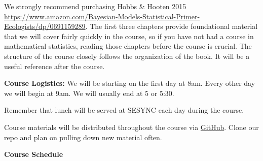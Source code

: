 \documentclass[11pt]{article}
\begin{document}
We strongly recommend purchasing Hobbs \& Hooten 2015 \href{https://www.amazon.com/Bayesian-Models-Statistical-Primer-Ecologists/dp/0691159289}{https://www.amazon.com/Bayesian-Models-Statistical-Primer-Ecologists/dp/0691159289}. The first three chapters provide foundational material that we will cover fairly quickly in the course, so if you have not had a course in mathematical statistics, reading those chapters before the course is crucial. The structure of the course closely follows the organization of the book.  It will be a useful reference after the course.

\textbf{\large Course Logistics:} 
We will be starting on the first day at 8am.  Every other day we will begin at 9am. We will usually end at 5 or 5:30.  

Remember that lunch will be served at SESYNC each day during the course.

Course materials will be distributed throughout the course via \href{https://github.com/CCheCastaldo/SESYNCBayes}{GitHub}.  Clone our repo and plan on pulling down new material often.

\newpage
\begin{center}
\textbf{\large Course Schedule}
\end{center}
\end{document}
